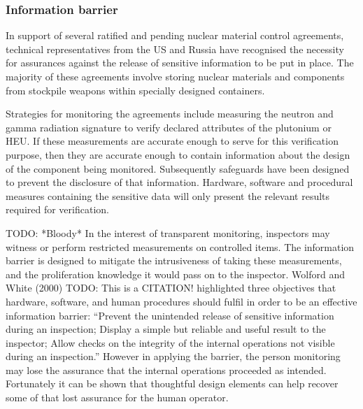 \documentclass[twoside,titlepage,11pt,twocolumn,a4paper]{article}
\begin{document}
\subsubsection{Information barrier}
In support of several ratified and pending nuclear material control
agreements, technical representatives from the US and Russia have
recognised the necessity for assurances against the release of
sensitive information to be put in place.  The majority of these
agreements involve storing nuclear materials and components from
stockpile weapons within specially designed containers.

Strategies for monitoring the agreements include measuring the neutron
and gamma radiation signature to verify declared attributes of the
plutonium or HEU.  If these measurements are accurate enough to serve
for this verification purpose, then they are accurate enough to
contain information about the design of the component being
monitored. Subsequently safeguards have been designed to prevent the
disclosure of that information. Hardware, software and procedural
measures containing the sensitive data will only present the relevant
results required for verification.

TODO: *Bloody* \citep{wolford2000} In the
interest of transparent monitoring, inspectors may witness or perform
restricted measurements on controlled items. The information barrier
is designed to mitigate the intrusiveness of taking these
measurements, and the proliferation knowledge it would pass on to the
inspector. Wolford and White (2000) TODO: This is a CITATION!
highlighted three objectives that hardware, software, and human
procedures should fulfil in order to be an effective information
barrier: ``Prevent the unintended release of sensitive information
during an inspection; Display a simple but reliable and useful result
to the inspector; Allow checks on the integrity of the internal
operations not visible during an inspection.''  However in applying
the barrier, the person monitoring may lose the assurance that the
internal operations proceeded as intended. Fortunately it can be shown
that thoughtful design elements can help recover some of that lost
assurance for the human operator.
\end{document}
